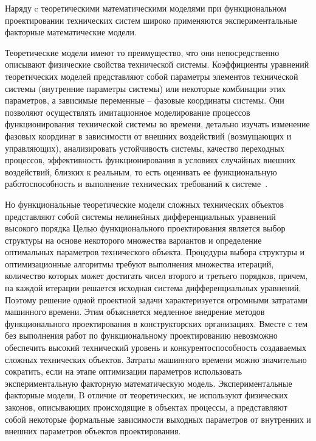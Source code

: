 Наряду c теоретическими математическими моделями при
функциональном проектировании технических систем широко применяются
экспериментальные факторные математические модели.

Теоретические модели имеют то преимущество, что они непосредственно
описывают физические свойства технической системы. Коэффициенты
уравнений теоретических моделей представляют собой параметры элементов
технической системы (внутренние параметры системы) или некоторые
комбинации этих параметров, а зависимые переменные – фазовые координаты
системы. Они позволяют осуществлять имитационное моделирование процессов
функционирования технической системы во времени, детально изучать
изменение фазовых координат в зависимости от внешних воздействий
(возмущающих и управляющих), анализировать устойчивость системы, качество
переходных процессов, эффективность функционирования в условиях
случайных внешних воздействий, близких к реальным, то есть оценивать ее
функциональную работоспособность и выполнение технических требований к
системе~\cite{modeling:2004}.

Но функциональные теоретические модели сложных технических
объектов представляют собой системы нелинейных дифференциальных
уравнений высокого порядка Целью функционального проектирования является
выбор структуры на основе некоторого множества вариантов и определение
оптимальных параметров технического объекта. Процедуры выбора структуры
и оптимизационные алгоритмы требуют выполнения множества итераций,
количество которых может достигать чисел второго и третьего порядков,
причем, на каждой итерации решается исходная система дифференциальных уравнений. Поэтому решение одной проектной задачи характеризуется
огромными затратами машинного времени. Этим объясняется медленное
внедрение методов функционального проектирования в конструкторских
организациях. Вместе с тем без выполнения работ по функциональному
проектированию невозможно обеспечить высокий технический уровень и
конкурентоспособность создаваемых сложных технических объектов. Затраты
машинного времени можно значительно сократить, если на этапе оптимизации
параметров использовать экспериментальную факторную математическую
модель. Экспериментальные факторные модели, B отличие от теоретических, не
используют физических законов, описывающих происходящие в объектах
процессы, а представляют собой некоторые формальные зависимости выходных
параметров от внутренних и внешних параметров объектов проектирования.

